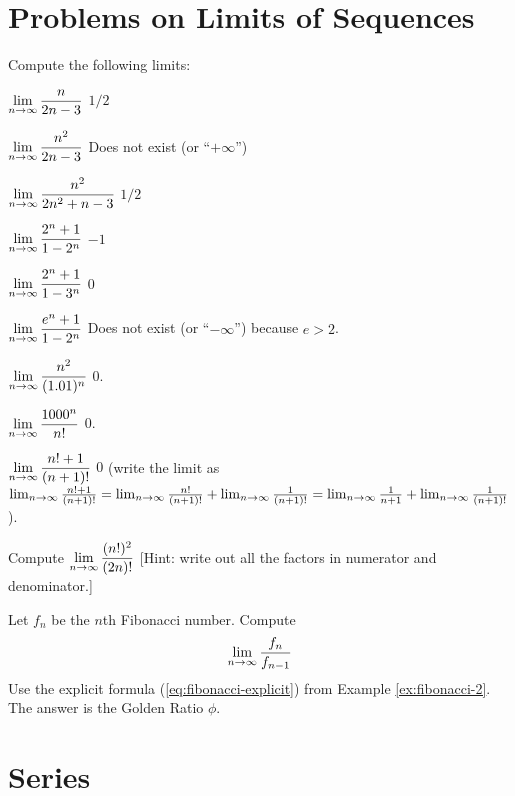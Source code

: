\section{Problems on Limits of Sequences} %
\problemfont %
\begin{multicols}{2}

Compute the following limits:

\problem \(\displaystyle \lim_{n\to\infty} \frac n{2n-3} \) %
\answer %
$1/2$
\endanswer

\problem \(\displaystyle \lim_{n\to\infty} \frac{n^2}{2n-3} \) %
\answer %
Does not exist (or ``$+\infty$'')
\endanswer

\problem \(\displaystyle \lim_{n\to\infty} \frac{n^2}{2n^2+n-3}\) %
\answer %
$1/2$
\endanswer

\problem \(\displaystyle \lim_{n\to\infty} \frac{2^n+1}{1-2^n}\) %
\answer %
$-1$
\endanswer

\problem \(\displaystyle \lim_{n\to\infty} \frac{2^n+1}{1-3^n}\) %
\answer %
$0$
\endanswer

\problem \(\displaystyle \lim_{n\to\infty} \frac{e^n+1}{1-2^n}\) %
\answer %
Does not exist (or ``$-\infty$'') because $e>2$.
\endanswer

\problem \(\displaystyle \lim_{n\to\infty} \frac{n^2}{(1.01)^n}\) %
\answer %
$0$.
\endanswer

\problem \(\displaystyle \lim_{n\to\infty} \frac{1000^n}{n!}\) %
\answer %
$0$.
\endanswer

\problem \(\displaystyle \lim_{n\to\infty} \frac{n!+1}{(n+1)!}\) %
\answer %
$0$ (write the limit as $ \lim_{n\to\infty} \frac{n!+1}{(n+1)!} =\lim_{n\to\infty}
\frac{n!}{(n+1)!} + \lim_{n\to\infty} \frac{1}{(n+1)!} = \lim_{n\to\infty} \frac{1}{n+1}
+ \lim_{n\to\infty} \frac{1}{(n+1)!}$).
\endanswer

\problem \groupproblem  Compute \(\displaystyle\lim_{n\to\infty} \frac{(n!)^2}{(2n)!}\) [Hint: write out %
all the factors in numerator and denominator.]

\problem \groupproblem  Let $f_n$ be the $n$th Fibonacci number. Compute %
\[
\lim_{n\to\infty} \frac{f_n}{f_{n-1}}
\]
\answer %
Use the explicit formula (\ref{eq:fibonacci-explicit}) from Example
\ref{ex:fibonacci-2}.  The answer is the Golden Ratio $\phi$.
\endanswer
\end{multicols}
\noproblemfont

\section{Series} %
\label{sec:series}


